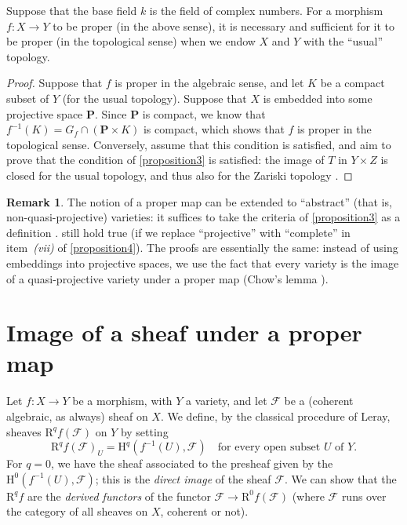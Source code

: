 \documentclass{article}
\theoremstyle{plain}
\newenvironment{proposition}[1]
    {\renewcommand\theinnercustomproposition{#1}\innercustomproposition}
    {\endinnercustomproposition}
\theoremstyle{definition}
\newtheorem*{remark}{Remark}
\newcommand{\sh}[1]{{\mathscr{#1}}}
\newcommand{\HH}{\mathrm{H}}
\newcommand{\RR}{\mathrm{R}}
\newcommand{\PP}{\mathbf{P}}
\newcommand{\oldpage}[1]{\marginpar{\footnotesize$\Big\vert$ \textit{p.~#1}}}
\begin{document}
\begin{proposition}{5}
\label{proposition5}
  Suppose that the base field $k$ is the field of complex numbers.
  For a morphism $f\colon X\to Y$ to be proper (in the above sense), it is necessary and sufficient for it to be proper (in the topological sense) when we endow $X$ and $Y$ with the ``usual'' topology.
\end{proposition}

\begin{proof}
  Suppose that $f$ is proper in the algebraic sense, and let $K$ be a compact subset of $Y$ (for the usual topology).
  Suppose that $X$ is embedded into some projective space $\PP$.
  Since $\PP$ is compact, we know that $f^{-1}(K)=G_f\cap(\PP\times K)$ is compact, which shows that $f$ is proper in the topological sense.
  Conversely, assume that this condition is satisfied, and aim to prove that the condition of \cref{proposition3} is satisfied:
\oldpage{102}
  the image of $T$ in $Y\times Z$ is closed for the usual topology, and thus also for the Zariski topology \cite[proposition~7, p.~12]{13}.
\end{proof}

\begin{remark}
  The notion of a proper map can be extended to ``abstract'' (that is, non-quasi-projective) varieties:
  it suffices to take the criteria of \cref{proposition3} as a definition \cite{4}.
   still hold true (if we replace ``projective'' with ``complete'' in item~\emph{(vii)} of \cref{proposition4}).
  The proofs are essentially the same:
  instead of using embeddings into projective spaces, we use the fact that every variety is the image of a quasi-projective variety under a proper map (Chow's lemma \cite{4,14}).
\end{remark}


\section{Image of a sheaf under a proper map}
\label{section3}

Let $f\colon X\to Y$ be a morphism, with $Y$ a variety, and let $\sh{F}$ be a (coherent algebraic, as always) sheaf on $X$.
We define, by the classical procedure of Leray, sheaves $\RR^qf(\sh{F})$ on $Y$ by setting
\[
  \RR^qf(\sh{F})_U = \HH^q(f^{-1}(U),\sh{F})
  \quad\mbox{for every open subset $U$ of $Y$.}
\]
For $q=0$, we have the sheaf associated to the presheaf given by the $\HH^0(f^{-1}(U),\sh{F})$;
this is the \emph{direct image} of the sheaf $\sh{F}$.
We can show \cite{7} that the $\RR^qf$ are the \emph{derived functors} of the functor $\sh{F}\to\RR^0f(\sh{F})$ (where $\sh{F}$ runs over the category of all sheaves on $X$, coherent or not).
\end{document}
